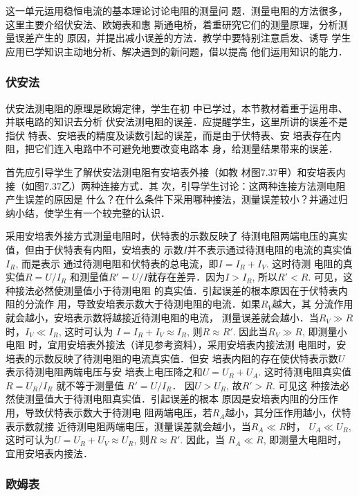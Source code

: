 这一单元运用稳恒电流的基本理论讨论电阻的测量问
题．测量电阻的方法很多，这里主要介绍伏安法、欧姆表和惠
斯通电桥，着重研究它们的测量原理，分析测量误差产生的
原因，并提出减小误差的方法．教学中要特别注意启发、诱导
学生应用已学知识主动地分析、解决遇到的新问题，借以提高
他们运用知识的能力．

\subsubsection{伏安法}

伏安法测电阻的原理是欧姆定律，学生在初
中已学过，本节教材着重于运用串、并联电路的知识去分析
伏安法测电阻的误差．应提醒学生，这里所讲的误差不是指伏
特表、安培表的精度及读数引起的误差，而是由于伏特表、安
培表存在内阻，把它们连入电路中不可避免地要改变电路本
身，给测量结果带来的误差．

首先应引导学生了解伏安法测电阻有安培表外接（如教
材图7.37甲）和安培表内接（如图7.37乙）两种连接方式．其
次，引导学生讨论：这两种连接方法测电阻产生误差的原因是
什么？在什么条件下采用哪种接法，测量误差较小？并通过归
纳小结，使学生有一个较完整的认识．

采用安培表外接方式测量电阻时，伏特表的示数反映了
待测电阻两端电压的真实值，但由于伏特表有内阻，安培表的
示数$I$并不表示通过待测电阻的电流的真实值$I_R$, 而是表示
通过待测电阻和伏特表的总电流，即$I=I_R+I_V$. 这时待测
电阻的真实值$R=U/I_R$
和测量值$R'=U/I$就存在差异．因为$I>
I_R$, 所以$R'<R$. 可见，这种接法必然使测量值小于待测电阻
的真实值．引起误差的根本原因在于伏特表内阻的分流作
用，导致安培表示数大于待测电阻的电流．如果$R_V$越大，其
分流作用就会越小，安培表示数将越接近待测电阻的电流，
测量误差就会越小．当$R_V\gg R$时，$I_V\ll I_R$, 这时可认为
$I=I_R+I_V\approx I_R$, 则$R\approx R'$. 因此当$R_V\gg R$, 即测量小电阻
时，宜用安培表外接法（详见参考资料），采用安培表内接法测
电阻时，安培表的示数反映了待测电阻的电流真实值．但安
培表内阻的存在使伏特表示数$U$表示待测电阻两端电压与安
培表上电压降之和$U=U_R+U_A$. 这时待测电阻真实值$R=U_R/I_R$
就不等于测量值 $R'=U/I_R$．
因$U>U_R$, 故$R'>R$. 可见这
种接法必然使测量值大于待测电阻真实值．引起误差的根本
原因是安培表内阻的分压作用，导致伏特表示数大于待测电
阻两端电压，若$R_A$越小，其分压作用越小，伏特表示数就接
近待测电阻两端电压，测量误差就会越小，当$R_A\ll R$时，
$U_A\ll U_R$, 这时可认为$U=U_R+U_V\approx U_R$, 则$R\approx R'$. 因此，当
$R_A\ll R$, 即测量大电阻时，宜用安培表内接法．

\subsubsection{欧姆表}

